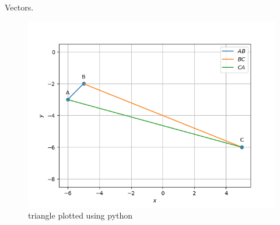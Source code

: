 \begin{table}[H]
        \centering
        
        \caption{Vectors.}
        \label{tab:Vectors}
    \end{table}
\begin{figure}[H]
\includegraphics[width=\columnwidth]{1.1/figs/11.png}
\caption{triangle plotted using python}
\label{fig:i_triangle_py}
\end{figure}

